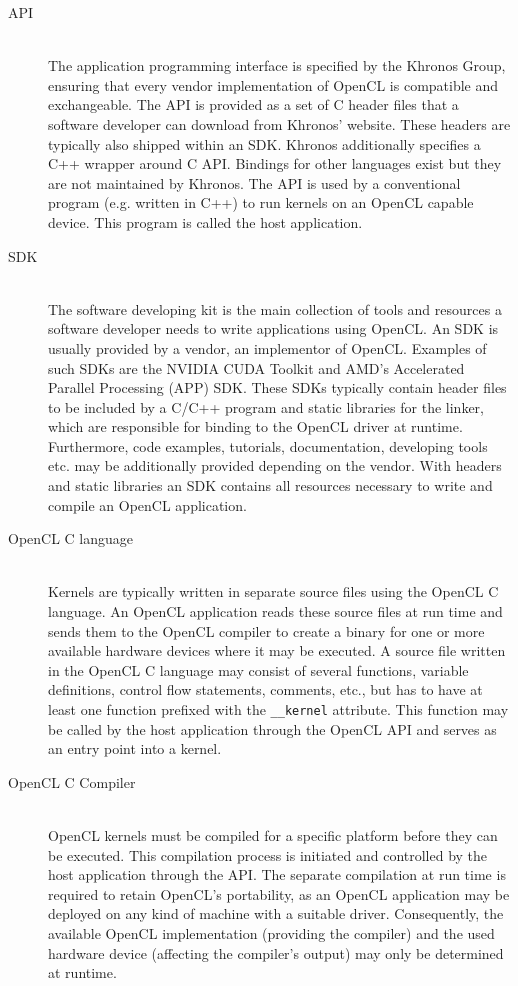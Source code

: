 \begin{description}
	\item[API] \hfill \\
	The application programming interface is specified by the Khronos Group, ensuring that every vendor implementation of OpenCL is compatible and exchangeable. The API is provided as a set of C header files that a software developer can download from Khronos' website. These headers are typically also shipped within an SDK. Khronos additionally specifies a C++ wrapper around C API. Bindings for other languages exist but they are not maintained by Khronos.
	The API is used by a conventional program (e.g. written in C++) to run kernels on an OpenCL capable device. This program is called the host application.
	\item[SDK] \hfill \\
	The software developing kit is the main collection of tools and resources a software developer needs to write applications using OpenCL. An SDK is usually provided by a vendor, an implementor of OpenCL. Examples of such SDKs are the NVIDIA CUDA Toolkit and AMD's Accelerated Parallel Processing (APP) SDK. These SDKs typically contain header files to be included by a C/C++ program and static libraries for the linker, which are responsible for binding to the OpenCL driver at runtime. Furthermore, code examples, tutorials, documentation, developing tools etc. may be additionally provided depending on the vendor. With headers and static libraries an SDK contains all resources necessary to write and compile an OpenCL application.
	\item[OpenCL C language] \hfill \\
	Kernels are typically written in separate source files using the OpenCL C language. An OpenCL application reads these source files at run time and sends them to the OpenCL compiler to create a binary for one or more available hardware devices where it may be executed. A source file written in the OpenCL C language may consist of several functions, variable definitions, control flow statements, comments, etc., but has to have at least one function prefixed with the \lstinline!__kernel! attribute. This function may be called by the host application through the OpenCL API and serves as an entry point into a kernel.
	\item[OpenCL C Compiler] \hfill \\
	OpenCL kernels must be compiled for a specific platform before they can be executed. This compilation process is initiated and controlled by the host application through the API. The separate compilation at run time is required to retain OpenCL's portability, as an OpenCL application may be deployed on any kind of machine with a suitable driver. Consequently, the available OpenCL implementation (providing the compiler) and the used hardware device (affecting the compiler's output) may only be determined at runtime.

\end{description}
